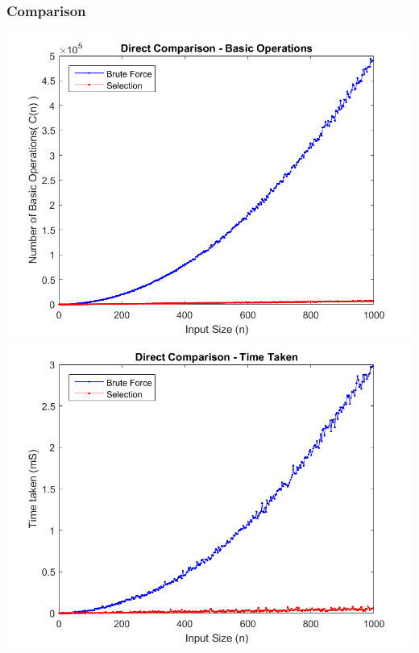 \documentclass{article}
\begin{document}
        \subsubsection{Comparison}
            \includegraphics[scale=0.7]{Images/direct_comparison_basic_operations.png}\\
            \includegraphics[scale=0.7]{Images/direct_comparison_time_taken.png}
\end{document}
